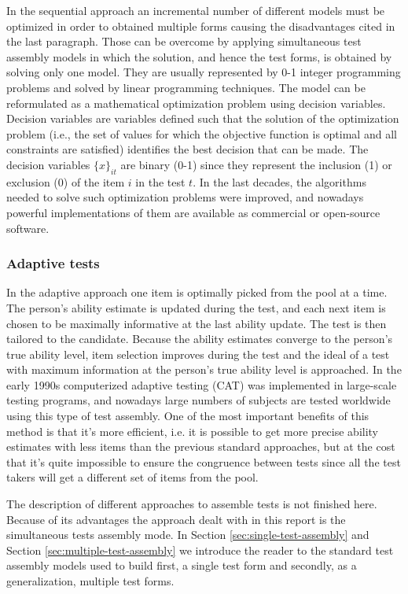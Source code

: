 In the sequential approach an incremental number of different models must be optimized in order to obtained multiple forms causing the disadvantages cited in the last paragraph. Those can be overcome by applying simultaneous test assembly models in which the solution, and hence the test forms, is obtained by solving only one model. They are usually represented by 0-1 integer programming problems and solved by linear programming techniques. The model can be reformulated as a mathematical optimization problem using decision variables. Decision variables are variables defined such that the solution of the optimization problem (i.e., the set of values for which the objective function is optimal and all constraints are satisfied) identifies the best decision that can be made. The decision variables $\{x\}_{it}$ are binary (0-1) since they represent the inclusion (1) or exclusion (0) of the item $i$ in the test $t$. In the last decades, the algorithms needed to solve such optimization problems were improved, and nowadays powerful implementations of them are available as commercial or open-source software.

\subsubsection{Adaptive tests}

In the adaptive approach one item is optimally picked from the pool at a time. The person's ability estimate is updated during the test, and each next item is chosen to be maximally informative at the last ability update. The test is then tailored to the candidate. Because the ability estimates converge to the person's true ability level, item selection improves during the test and the ideal of a test with maximum information at the person's true ability level is approached. In the early 1990s computerized adaptive testing (CAT) was implemented in large-scale testing programs, and nowadays large numbers of subjects are tested worldwide using this type of test assembly. One of the most important benefits of this method is that it's more efficient, i.e. it is possible to get more precise ability estimates with less items than the previous standard approaches, but at the cost that it's quite impossible to ensure the congruence between tests since all the test takers will get a different set of items from the pool.

The description of different approaches to assemble tests is not finished here. Because of its advantages the approach dealt with in this report is the simultaneous tests assembly mode.
In Section \ref{sec:single-test-assembly} and Section \ref{sec:multiple-test-assembly} we introduce the reader to the standard test assembly models used to build first, a single test form and secondly, as a generalization, multiple test forms.

